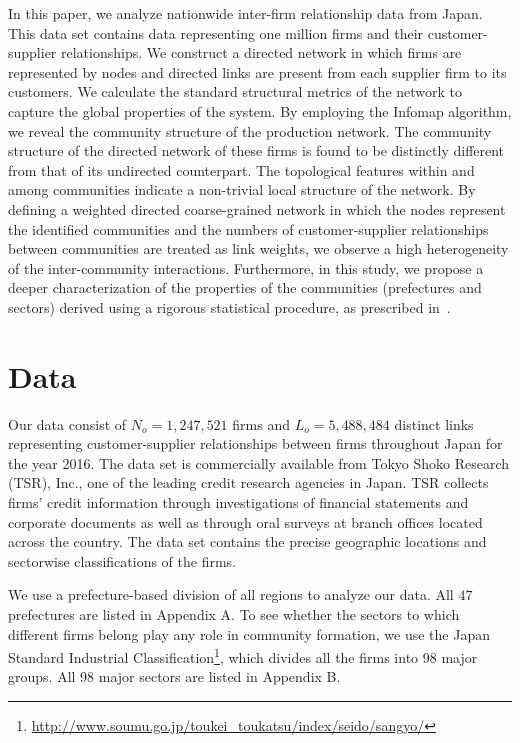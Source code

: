 \documentclass[pre,floatfix,twocolumn,showpacs,a4paper,nofootinbib]{revtex4}
\begin{document}
In this paper, we analyze nationwide inter-firm relationship data from Japan. 
This data set contains data representing one million firms and their customer-supplier relationships. We construct a directed network in which firms are 
represented by nodes and directed links are present from each supplier firm to its customers.
We calculate the standard structural metrics of the network to capture the global properties of the system.
By employing the Infomap algorithm, we reveal the community structure of the production network. 
The community structure of the directed network of these firms is found to be distinctly different from that of its undirected counterpart.
The topological features within and among communities indicate a non-trivial local structure of the network. By defining a weighted
directed coarse-grained network in which the nodes represent the identified communities and the numbers of customer-supplier relationships
between communities are treated as link weights, we observe a high heterogeneity of the inter-community interactions. 
Furthermore, in this study, we propose a deeper characterization of the properties of the communities (prefectures and sectors) derived using a 
rigorous statistical procedure, as prescribed in~\cite{tumminello2011community}. 


\section {Data}   
\label{data}

Our data consist of $N_o = 1,247,521$ firms and $L_o = 5,488,484$ distinct links representing  customer-supplier relationships between firms throughout Japan 
for the year 2016. The data set is commercially available from Tokyo Shoko Research (TSR), Inc., one of the leading credit research agencies in Japan. 
TSR collects firms' credit information through investigations of financial statements and corporate documents as well as through 
oral surveys at branch offices located across the country. The data set contains the precise geographic locations and sectorwise classifications of the 
firms. 

We use a prefecture-based division of all regions to analyze our data. All $47$ prefectures 
are listed in Appendix A. 
To see whether the sectors to which different firms belong play any role in community formation, we use the Japan Standard Industrial Classification\footnote{\url{http://www.soumu.go.jp/toukei_toukatsu/index/seido/sangyo/}}, which
divides all the firms into 98 major groups. All 98 major sectors 
are listed in Appendix B. 
\end{document}
